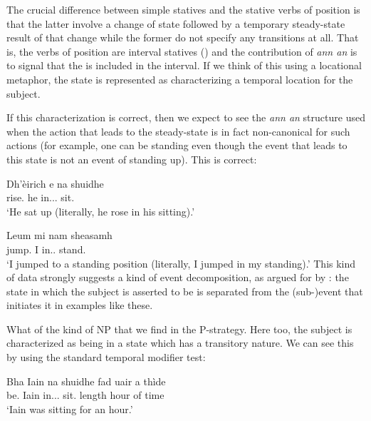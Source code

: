 \documentclass[output=paper]{langsci/langscibook}
\begin{document}
\ea {}
\z\z
The crucial difference between simple statives and the stative verbs of
position is that the latter involve a change of state followed by a temporary
steady-state result of that change while the former do not specify any
transitions at all. That is, the verbs of position are interval statives
(\citealt[184]{Dowty:1979}) and the contribution of \emph{ann an} is to signal
that the  is included in the interval. If we think of this using a
locational metaphor, the state is represented as characterizing a temporal
location for the subject.

If this characterization is correct, then we expect to see the \emph{ann an}
structure used when the action that leads to the steady-state is in fact
non-canonical for such actions (for example, one can be standing even though
the event that leads to this state is not an event of standing up). This is
correct:

\ea {}
\sn \gll Dh'\`eirich e na shuidhe\\
rise.\Pst{} he in.\Poss.\Tsg.\M{} sit.\Vn{}\\
\glt \enquote*{He sat up (literally, he rose in his sitting).}
\z

\ea {}
\sn \gll  Leum mi nam sheasamh\\
jump.\Pst{} I in.\Poss.\Fsg{} stand.\Vn{}\\
\glt \enquote*{I jumped to a standing position (literally, I jumped in my standing).}\label{leum}
\z
This kind of data strongly suggests a kind of event decomposition, as argued
for by \citet{ramchand08}: the state in which the subject is asserted to be is
separated from the (sub-)event that initiates it in examples like these.

What of the kind of NP  that we find in the P-strategy. Here too,
the subject is characterized as being in a state which has a transitory nature.
We can see this by using the standard temporal modifier test:

\ea {}
\sn \gll  Bha Iain na shuidhe fad uair a th\`ide\\
be.\Pst{} Iain in.\Poss.\Tsg.\M{} sit.\Vn{} length hour of time\\
\glt \enquote*{Iain was sitting for an hour.}
\z
\end{document}
